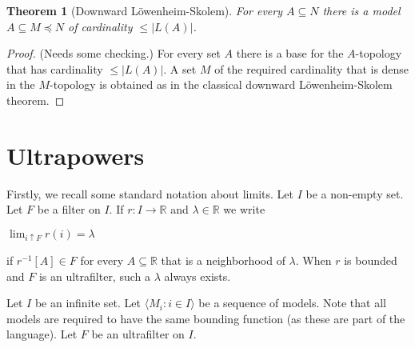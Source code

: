 \documentclass[12pt,letterpaper,oneside,reqno]{amsart}
\theoremstyle{plain}
\newtheorem{theorem}{Theorem}%
\theoremstyle{remark}
\begin{document}
\begin{theorem}[Downward L\"owenheim-Skolem] For every $A\subseteq N$ there is a model $A\subseteq M\preceq N$ of cardinality $\le |L(A)|$.
\end{theorem}
\begin{proof} (Needs some checking.)
For every set $A$ there is a base for the $A\mbox{-}$topology that has cardinality $\le |L(A)|$. A set $M$ of the required cardinality that is dense in the  $M\mbox{-}$topology is obtained as in the classical downward L\"owenheim-Skolem theorem.
\end{proof}

\section{Ultrapowers}\label{ultrapws}



Firstly, we recall some standard notation about limits.
Let $I$ be a non-empty set.
Let $F$ be a filter on $I$.
If $r:I\to{\mathds R}$ and $\lambda\in{\mathds R}$ we write

\hfil$\displaystyle \lim_{i\uparrow F}r(i)=\lambda$

if $r^{-1}[A]\in F$ for every $A\subseteq{\mathds R}$ that is a neighborhood of $\lambda$.
When $r$ is bounded and $F$ is an ultrafilter, such a $\lambda$ always exists.

Let $I$ be an infinite set.
Let $\langle M_i:i\in I\rangle$ be a sequence of models.
Note that all models are required to have the same bounding function (as these are part of the language).
Let $F$ be an ultrafilter on $I$.
\end{document}
